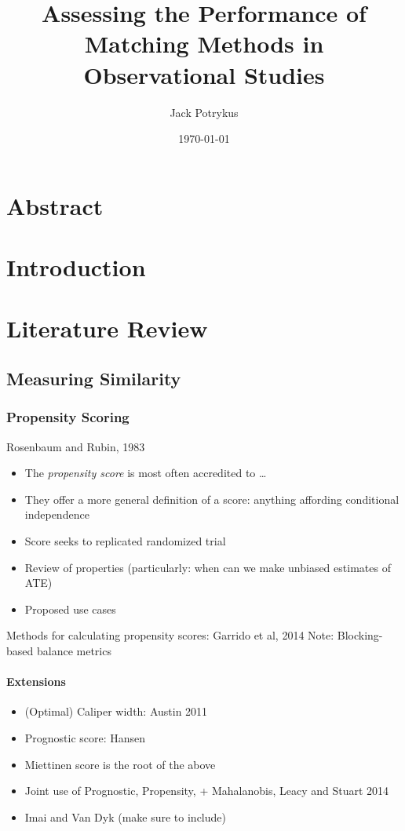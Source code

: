 \documentclass[11pt]{extarticle}
\title{Assessing the Performance of Matching Methods in Observational Studies}
\author{Jack Potrykus}
\date{\today}
\begin{document}
\maketitle

\section*{Abstract}
\tableofcontents
\newpage


\section{Introduction}



\section{Literature Review}

\subsection{Measuring Similarity}

\subsubsection{Propensity Scoring}

Rosenbaum and Rubin, 1983
\begin{itemize}
  \item The \emph{propensity score} is most often accredited to \ldots
  \item They offer a more general definition of a score: anything affording conditional independence
  \item Score seeks to replicated randomized trial
  \item Review of properties (particularly: when can we make unbiased estimates of ATE)
  \item Proposed use cases
\end{itemize}

Methods for calculating propensity scores: Garrido et al, 2014
Note: Blocking-based balance metrics

\paragraph{Extensions}
\begin{itemize}
  \item (Optimal) Caliper width: Austin 2011
  \item Prognostic score: Hansen
  \item Miettinen score is the root of the above
  \item Joint use of Prognostic, Propensity, + Mahalanobis, Leacy and Stuart 2014
  \item Imai and Van Dyk (make sure to include)
\end{itemize}
\end{document}
